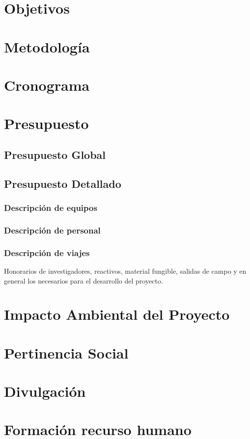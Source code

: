 \documentclass[12pt]{article}
\begin{document}
\section{Objetivos}

\section{Metodolog\'ia}

\section{Cronograma}

\section{Presupuesto}

\subsection{Presupuesto Global}

\subsection{Presupuesto Detallado}

\subsubsection*{Descripci\'on de equipos}

\subsubsection*{Descripci\'on de personal}

\subsubsection*{Descripci\'on de viajes}

Honorarios de investigadores, reactivos, material fungible, salidas de
campo y en general los necesarios para el desarrollo del proyecto. 

\section{Impacto Ambiental del Proyecto}
\section{Pertinencia Social}

\section{Divulgaci\'on}

\section{Formaci\'on recurso humano}


\end{document}
